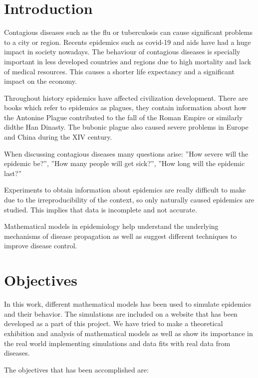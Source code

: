 \section*{Introduction}

Contagious diseases such as the flu or tuberculosis can cause significant problems to a city or region. Recents epidemics such as covid-19 and aids have had a huge impact in society nowadays. The behaviour of contagious diseases is specially important in less developed countries and regions due to high mortality and lack of medical resources. This causes a shorter life expectancy and a significant impact on the economy.

Throughout history epidemics have affected civilization development. There are books which refer to epidemics as plagues, they contain information about how the Antonine Plague contributed to the fall of the Roman Empire or similarly didthe Han Dinasty. The bubonic plague also caused severe problems in Europe and China during the XIV century.

When discussing contagious diseases many questions arise: ''How severe will the epidemic be?'', ''How many people will get sick?'', ''How long will the epidemic last?''

Experiments to obtain information about epidemics are really difficult to make due to the irreproducibility of the context, so only naturally caused epidemics are studied. This implies that data is incomplete and not accurate.

Mathematical models in epidemiology help understand the underlying mechanisms of disease propagation as well as suggest different techniques to improve disease control.

\section*{Objectives}

In this work, different mathematical models has been used to simulate epidemics and their behavior. The simulations are included on a website that has been developed as a part of this project. We have tried to make a theoretical exhibition and analysis of mathematical models as well as show its importance in the real world implementing simulations and data fits with real data from diseases.

The objectives that has been accomplished are:

